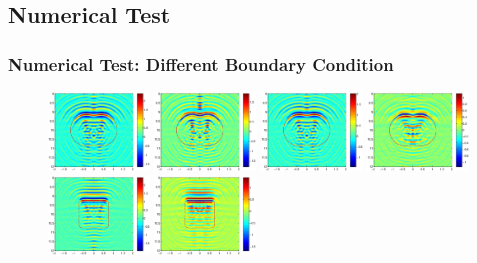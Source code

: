 \documentclass[cjk,8pt]{beamer}
\begin{document}
\begin{CJK*}{GBK}{kai}
\section{Numerical Test}
\begin{frame}
\frametitle{Numerical Test: Different Boundary Condition}
 \begin{figure}
 	\centering
 	\includegraphics[width=0.24\textwidth]{./graphic/peanut_3pi.eps}
 	\includegraphics[width=0.24\textwidth]{./graphic/peanut_3pi_neumann.eps}
 	\includegraphics[width=0.24\textwidth]{./graphic/peanut_3pi_impedance_1.eps}
 	\includegraphics[width=0.24\textwidth]{./graphic/peanut_3pi_transmission.eps}\\
    \includegraphics[width=0.24\textwidth]{./graphic/rectangle_3pi.eps}
 	\includegraphics[width=0.24\textwidth]{./graphic/rectangle_3pi_neumann.eps}

\end{figure}
\end{frame}
\end{CJK*}
\end{document}

